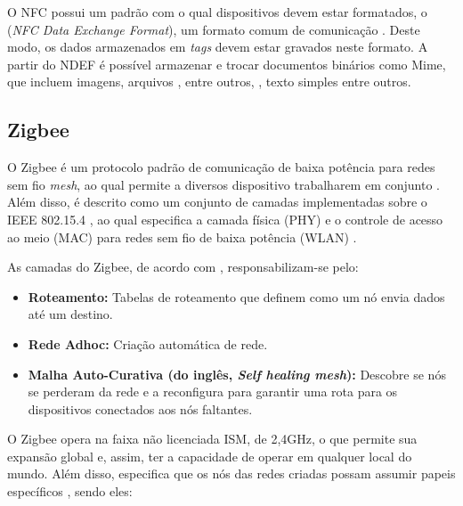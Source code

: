 O NFC possui um padrão com o qual dispositivos devem estar formatados, o  (\textit{NFC Data Exchange Format}), um formato comum de comunicação \cite{Igoe2014}. Deste 
modo, os dados armazenados em \textit{tags} devem estar gravados neste formato. A partir do NDEF é possível armazenar e trocar documentos binários como Mime, que incluem imagens, arquivos , entre outros, 
, texto simples entre outros.


\subsection{Zigbee}

O Zigbee é um protocolo padrão de comunicação de baixa potência para redes sem fio \textit{mesh}, ao qual permite a diversos dispositivo trabalharem em conjunto \cite{Faludi2011}. Além disso, é descrito como um conjunto de camadas implementadas sobre o IEEE 802.15.4 \cite{Faludi2011}, ao qual especifica a camada física (PHY) e o controle de acesso ao meio (MAC) para redes sem fio de baixa potência (WLAN) \cite{IEEE2011}.

As camadas do Zigbee, de acordo com , responsabilizam-se pelo:

\begin{itemize} \parskip -4pt
	\item \textbf{Roteamento:} Tabelas de roteamento que definem como um nó envia dados até um 
	destino.
	\item \textbf{Rede Adhoc:} Criação automática de rede.
	\item \textbf{Malha Auto-Curativa (do inglês, \textit{Self healing mesh}):} Descobre se nós se perderam da rede e a 
	reconfigura para garantir uma rota para os dispositivos conectados aos nós faltantes.
\end{itemize}

O Zigbee opera na faixa não licenciada ISM, de 2,4GHz, o que permite sua expansão global e, assim, ter a capacidade de operar em qualquer local do mundo. Além disso, especifica que os nós das redes criadas possam assumir papeis específicos \cite{Faludi2011}, sendo eles:

